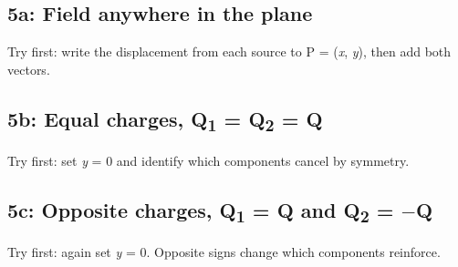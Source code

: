 \documentclass[11pt]{article}
\begin{document}
\begin{keepsection}
\begin{keepsection}
\subsection{5a: Field anywhere in the plane}

Try first: write the displacement from each source to P = (\textit{x}, \textit{y}), then add both vectors.

\end{keepsection}

\begin{keepsection}
\subsection{5b: Equal charges, Q\textsubscript{1} = Q\textsubscript{2} = Q}

Try first: set \textit{y} = 0 and identify which components cancel by symmetry.

\end{keepsection}

\begin{keepsection}
\subsection{5c: Opposite charges, Q\textsubscript{1} = Q and Q\textsubscript{2} = \ensuremath{-}Q}

Try first: again set \textit{y} = 0. Opposite signs change which components reinforce.

\end{keepsection}
\end{keepsection}
\end{document}
